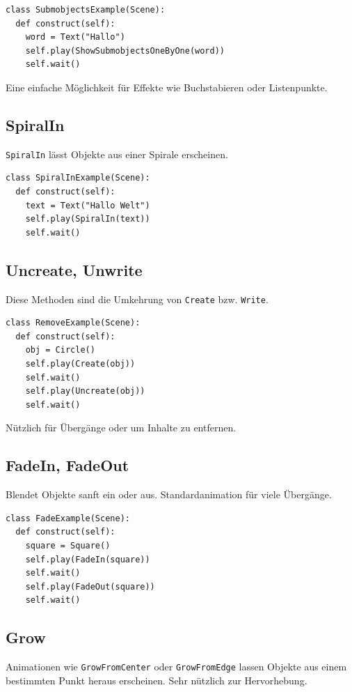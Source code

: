 \documentclass[12pt]{article}
\begin{document}
\begin{verbatim}
class SubmobjectsExample(Scene):
  def construct(self):
    word = Text("Hallo")
    self.play(ShowSubmobjectsOneByOne(word))
    self.wait()
\end{verbatim}

Eine einfache Möglichkeit für Effekte wie Buchstabieren oder Listenpunkte.

\subsection{SpiralIn}
\texttt{SpiralIn} lässt Objekte aus einer Spirale erscheinen.

\begin{verbatim}
class SpiralInExample(Scene):
  def construct(self):
    text = Text("Hallo Welt")
    self.play(SpiralIn(text))
    self.wait()
\end{verbatim}

\subsection{Uncreate, Unwrite}
Diese Methoden sind die Umkehrung von \texttt{Create} bzw. \texttt{Write}.

\begin{verbatim}
class RemoveExample(Scene):
  def construct(self):
    obj = Circle()
    self.play(Create(obj))
    self.wait()
    self.play(Uncreate(obj))
    self.wait()
\end{verbatim}

Nützlich für Übergänge oder um Inhalte zu entfernen.

\subsection{FadeIn, FadeOut}
Blendet Objekte sanft ein oder aus. Standardanimation für viele Übergänge.

\begin{verbatim}
class FadeExample(Scene):
  def construct(self):
    square = Square()
    self.play(FadeIn(square))
    self.wait()
    self.play(FadeOut(square))
    self.wait()
\end{verbatim}

\subsection{Grow}
Animationen wie \texttt{GrowFromCenter} oder \texttt{GrowFromEdge} lassen Objekte aus einem bestimmten Punkt heraus erscheinen. Sehr nützlich zur Hervorhebung.
\end{document}
